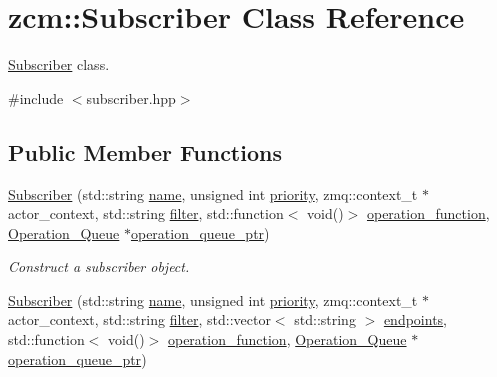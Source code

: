 \hypertarget{classzcm_1_1Subscriber}{\section{zcm\-:\-:Subscriber Class Reference}
\label{classzcm_1_1Subscriber}
}


\hyperlink{classzcm_1_1Subscriber}{Subscriber} class.  




{\ttfamily \#include $<$subscriber.\-hpp$>$}

\subsection*{Public Member Functions}
\begin{DoxyCompactItemize}
\item 
\hyperlink{classzcm_1_1Subscriber_a8477e4359c83f009ad34bbbd5e0c7b68}{Subscriber} (std\-::string \hyperlink{classzcm_1_1Subscriber_a2ec3b22204d0f3f72e996b19b086910b}{name}, unsigned int \hyperlink{classzcm_1_1Subscriber_a208baedba808c9229887ab8af00725fd}{priority}, zmq\-::context\-\_\-t $\ast$actor\-\_\-context, std\-::string \hyperlink{classzcm_1_1Subscriber_a28ab0921d97bc4d05ac6bb64c977cc35}{filter}, std\-::function$<$ void()$>$ \hyperlink{classzcm_1_1Subscriber_ab8e52c24d7dc57b33d2c1536de4197b2}{operation\-\_\-function}, \hyperlink{classzcm_1_1Operation__Queue}{Operation\-\_\-\-Queue} $\ast$\hyperlink{classzcm_1_1Subscriber_a1cd579aa570832f9656b9fa24747dde3}{operation\-\_\-queue\-\_\-ptr})
\begin{DoxyCompactList}\small\item\em Construct a subscriber object. \end{DoxyCompactList}\item 
\hyperlink{classzcm_1_1Subscriber_a248ea0aab7fc2d283f5373e33abd7287}{Subscriber} (std\-::string \hyperlink{classzcm_1_1Subscriber_a2ec3b22204d0f3f72e996b19b086910b}{name}, unsigned int \hyperlink{classzcm_1_1Subscriber_a208baedba808c9229887ab8af00725fd}{priority}, zmq\-::context\-\_\-t $\ast$actor\-\_\-context, std\-::string \hyperlink{classzcm_1_1Subscriber_a28ab0921d97bc4d05ac6bb64c977cc35}{filter}, std\-::vector$<$ std\-::string $>$ \hyperlink{classzcm_1_1Subscriber_a81590d7017038d6f50073baaa485a1b7}{endpoints}, std\-::function$<$ void()$>$ \hyperlink{classzcm_1_1Subscriber_ab8e52c24d7dc57b33d2c1536de4197b2}{operation\-\_\-function}, \hyperlink{classzcm_1_1Operation__Queue}{Operation\-\_\-\-Queue} $\ast$\hyperlink{classzcm_1_1Subscriber_a1cd579aa570832f9656b9fa24747dde3}{operation\-\_\-queue\-\_\-ptr})

\end{DoxyCompactItemize}
